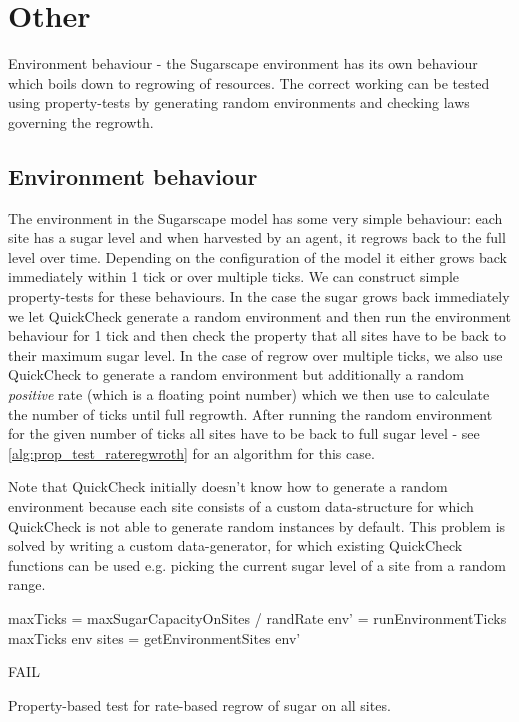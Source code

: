 \chapter{Other}

Environment behaviour - the Sugarscape environment has its own behaviour which boils down to regrowing of resources. The correct working can be tested using property-tests by generating random environments and checking laws governing the regrowth.

\section{Environment behaviour}
The environment in the Sugarscape model has some very simple behaviour: each site has a sugar level and when harvested by an agent, it regrows back to the full level over time. Depending on the configuration of the model it either grows back immediately within 1 tick or over multiple ticks. We can construct simple property-tests for these behaviours. In the case the sugar grows back immediately we let QuickCheck generate a random environment and then run the environment behaviour for 1 tick and then check the property that all sites have to be back to their maximum sugar level. In the case of regrow over multiple ticks, we also use QuickCheck to generate a random environment but additionally a random \textit{positive} rate (which is a floating point number) which we then use to calculate the number of ticks until full regrowth. After running the random environment for the given number of ticks all sites have to be back to full sugar level - see \ref{alg:prop_test_rateregwroth} for an algorithm for this case.

Note that QuickCheck initially doesn't know how to generate a random environment because each site consists of a custom data-structure for which QuickCheck is not able to generate random instances by default. This problem is solved by writing a custom data-generator, for which existing QuickCheck functions can be used e.g. picking the current sugar level of a site from a random range.

\begin{algorithm}
maxTicks = maxSugarCapacityOnSites / randRate\;
env' = runEnvironmentTicks maxTicks env\;
sites = getEnvironmentSites env'\;

 {
  FAIL\;
}
\caption{Property-based test for rate-based regrow of sugar on all sites.}
\end{algorithm}
\label{alg:prop_test_rateregwroth}

